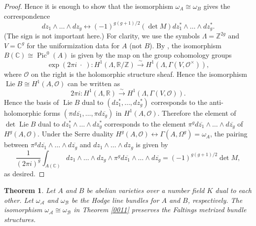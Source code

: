 \documentclass{amsart}
\newtheorem{theorem}{Theorem}[section]
\theoremstyle{remark}
\numberwithin{equation}{section}
\newcommand{\Order}{\mathcal{O}}
\newcommand{\isomto}{\overset{\sim}{\to}}
\newcommand{\closure}[1]{\overline{#1}}
\newcommand{\Z}{\mathbb{Z}}
\newcommand{\R}{\mathbb{R}}
\newcommand{\C}{\mathbb{C}}
\newcommand{\var}{\;\cdot\;}
\DeclareMathOperator{\Pic}{Pic}
\DeclareMathOperator{\Lie}{Lie}
\begin{document}
\begin{proof}
	Hence it is enough to show that
	the isomorphism $\omega_{A} \cong \omega_{B}$ gives the correspondence
		\begin{equation} \label{0026}
				d z_{1} \wedge \dots \wedge d z_{g}
			\leftrightarrow
				(-1)^{g (g + 1) / 2} (\det M)
				d z_{1}^{\ast} \wedge \dots \wedge d z_{g}^{\ast}.
		\end{equation}
	(The sign is not important here.)
	For clarity, we use the symbols
	$\Lambda = \Z^{2 g}$ and $V = \C^{g}$
	for the uniformization data for $A$ (not $B$).
	By \cite[Proposition 2.4.1]{BL04},
	the isomorphism $B(\C) \cong \Pic^{0}(A)$
	is given by the map on the group cohomology groups
		\begin{equation} \label{0025}
				\exp(2 \pi i \var)
			\colon
				H^{1}(\Lambda, \R / \Z)
			\stackrel{\sim}{\to}
				H^{1}(\Lambda, \Gamma(V, \Order^{\times})),
		\end{equation}
	where $\Order$ on the right is the holomorphic structure sheaf.
	Hence the isomorphism
	$\Lie B \cong H^{1}(A, \Order)$ can be written as
		\[
				2 \pi i
			\colon
				H^{1}(\Lambda, \R)
			\isomto
				H^{1}(\Lambda, \Gamma(V, \Order)).
		\]
	Hence the basis of $\Lie B$ dual to $(d z_{1}^{\ast}, \dots, d z_{g}^{\ast})$
	corresponds to the anti-holomorphic forms
	$(\pi d \closure{z_{1}}, \dots, \pi d \closure{z_{g}})$ in $H^{1}(A, \Order)$.
	Therefore the element of $\det \Lie B$ dual to
	$d z_{1}^{\ast} \wedge \dots \wedge d z_{g}^{\ast}$
	corresponds to the element
	$\pi^{g} d \closure{z_{1}} \wedge \dots \wedge d \closure{z_{g}}$
	of $H^{g}(A, \Order)$.
	Under the Serre duality
	$H^{g}(A, \Order) \leftrightarrow \Gamma(A, \Omega^{g}) = \omega_{A}$,
	the pairing between
	$\pi^{g} d \closure{z_{1}} \wedge \dots \wedge d \closure{z_{g}}$
	and $d z_{1} \wedge \dots \wedge d z_{g}$
	is given by
		\[
				\frac{1}{(2 \pi i)^{g}}
				\int_{A(\C)}
						d z_{1} \wedge \dots \wedge d z_{g}
					\wedge
						\pi^{g} d \closure{z_{1}} \wedge \dots \wedge d \closure{z_{g}}
			=
				(-1)^{g (g + 1) / 2}
				\det M,
		\]
	as desired.
\end{proof}

\begin{theorem} \label{0012}
	Let $A$ and $B$ be abelian varieties over a number field $K$
	dual to each other.
	Let $\omega_{\mathcal{A}}$ and $\omega_{\mathcal{B}}$ be
	the Hodge line bundles for $A$ and $B$, respectively.
	The isomorphism
	$\omega_{\mathcal{A}} \cong \omega_{\mathcal{B}}$
	in Theorem \ref{0011}
	preserves the Faltings metrized bundle structures.
\end{theorem}
\end{document}
